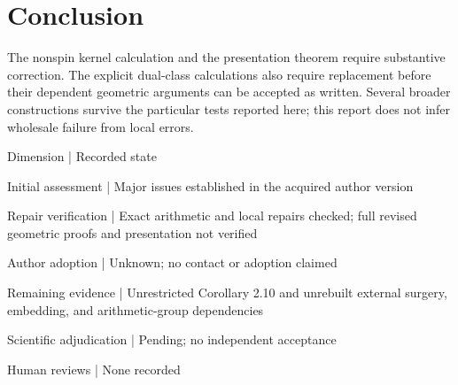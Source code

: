\documentclass[10pt]{article}
\begin{document}
\section*{Conclusion}
The nonspin kernel calculation and the presentation theorem require substantive correction. The explicit dual-class calculations also require replacement before their dependent geometric arguments can be accepted as written. Several broader constructions survive the particular tests reported here; this report does not infer wholesale failure from local errors.\par
Dimension | Recorded state\par
Initial assessment | Major issues established in the acquired author version\par
Repair verification | Exact arithmetic and local repairs checked; full revised geometric proofs and presentation not verified\par
Author adoption | Unknown; no contact or adoption claimed\par
Remaining evidence | Unrestricted Corollary 2.10 and unrebuilt external surgery, embedding, and arithmetic-group dependencies\par
Scientific adjudication | Pending; no independent acceptance\par
Human reviews | None recorded\par
\end{document}
